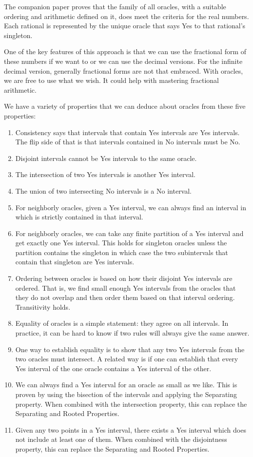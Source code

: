 \documentclass[12pt]{article}
\begin{document}
The companion paper proves that the family of all oracles, with a suitable ordering and arithmetic defined on it, does meet the criteria for the real numbers. Each rational is represented by the unique oracle that says Yes to that rational's singleton. 

One of the key features of this approach is that we can use the fractional form of these numbers if we want to or we can use the decimal versions. For the infinite decimal version, generally fractional forms are not that embraced. With oracles, we are free to use what we wish. It could help with mastering fractional arithmetic. 

We have a variety of properties that we can deduce about oracles from these five properties: 
\begin{enumerate}
    \item Consistency says that intervals that contain Yes intervals are Yes intervals. The flip side of that is that intervals contained in No intervals must be No. 
    \item Disjoint intervals cannot be Yes intervals to the same oracle.
    \item The intersection of two Yes intervals is another Yes interval. 
    \item The union of two intersecting No intervals is a No interval. 
    \item For neighborly oracles, given a Yes interval, we can always find an interval in which is strictly contained in that interval. 
    \item For neighborly oracles, we can take any finite partition of a Yes interval and get exactly one Yes interval. This holds for singleton oracles unless the partition contains the singleton in which case the two subintervals that contain that singleton are Yes intervals. 
    \item Ordering between oracles is based on how their disjoint Yes intervals are ordered. That is, we find small enough Yes intervals from the oracles that they do not overlap and then order them based on that interval ordering. Transitivity holds. 
    \item Equality of oracles is a simple statement: they agree on all intervals. In practice, it can be hard to know if two rules will always give the same answer. 
    \item One way to establish equality is to show that any two Yes intervals from the two oracles must intersect. A related way is if one can establish that every Yes interval of the one oracle contains a Yes interval of the other. 
    \item We can always find a Yes interval for an oracle as small as we like. This is proven by using the bisection of the intervals and applying the Separating property. When combined with the intersection property, this can replace the Separating and Rooted Properties. 
    \item Given any two points in a Yes interval, there exists a Yes interval which does not include at least one of them. When combined with the disjointness property, this can replace the Separating and Rooted Properties. 
\end{enumerate}
\end{document}
